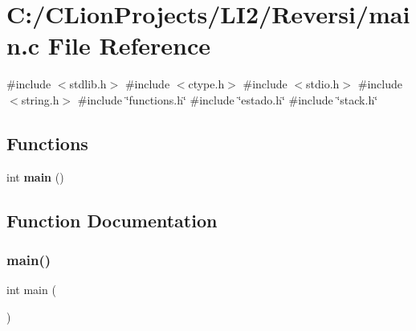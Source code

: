 \section{C\+:/\+C\+Lion\+Projects/\+L\+I2/\+Reversi/main.c File Reference}
\label{main_8c}
{\ttfamily \#include $<$stdlib.\+h$>$}\newline
{\ttfamily \#include $<$ctype.\+h$>$}\newline
{\ttfamily \#include $<$stdio.\+h$>$}\newline
{\ttfamily \#include $<$string.\+h$>$}\newline
{\ttfamily \#include \char`\"{}functions.\+h\char`\"{}}\newline
{\ttfamily \#include \char`\"{}estado.\+h\char`\"{}}\newline
{\ttfamily \#include \char`\"{}stack.\+h\char`\"{}}\newline
\subsection*{Functions}
\begin{DoxyCompactItemize}
\item 
int \textbf{ main} ()
\end{DoxyCompactItemize}


\subsection{Function Documentation}
\mbox{\label{main_8c_ae66f6b31b5ad750f1fe042a706a4e3d4}} 
\subsubsection{main()}
{\footnotesize\ttfamily int main (\begin{DoxyParamCaption}{ }\end{DoxyParamCaption})}

